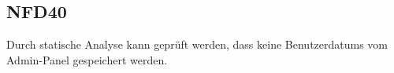 \subsection*{NFD40}
Durch \gls{statische Analyse} kann geprüft werden, dass keine \Glspl{Benutzerdatum} vom \Gls{Admin-Panel} gespeichert werden.